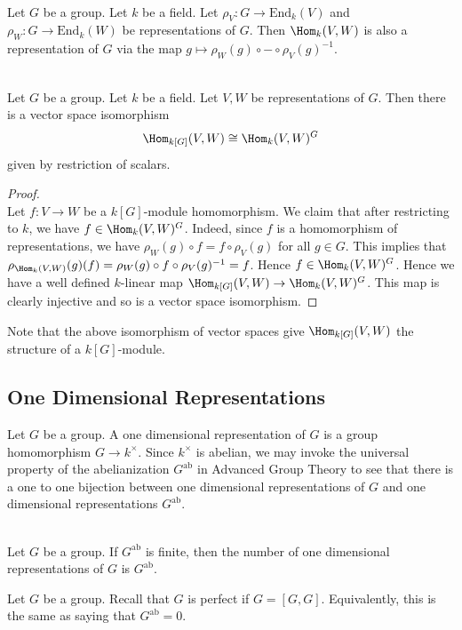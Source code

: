 \documentclass[a4paper]{article}
\begin{document}
\begin{lmm}{}{}\\
Let $G$ be a group. Let $k$ be a field. Let $\rho_V:G\to\text{End}_k(V)$ and $\rho_W:G\to\text{End}_k(W)$ be representations of $G$. Then $\Hom_k(V,W)$ is also a representation of $G$ via the map $g\mapsto\rho_W(g)\circ -\circ\rho_V(g)^{-1}$. 
\end{lmm}

\begin{prp}{}{}\\
Let $G$ be a group. Let $k$ be a field. Let $V,W$ be representations of $G$. Then there is a vector space isomorphism $$\Hom_{k[G]}(V,W)\cong\Hom_k(V,W)^G$$ given by restriction of scalars. 
\begin{proof}\\
Let $f:V\to W$ be a $k[G]$-module homomorphism. We claim that after restricting to $k$, we have $f\in\Hom_k(V,W)^G$. Indeed, since $f$ is a homomorphism of representations, we have $\rho_W(g)\circ f=f\circ\rho_V(g)$ for all $g\in G$. This implies that $\rho_{\Hom_k(V,W)}(g)(f)=\rho_W(g)\circ f\circ\rho_V(g)^{-1}=f$. Hence $f\in\Hom_k(V,W)^G$. Hence we have a well defined $k$-linear map $\Hom_{k[G]}(V,W)\to\Hom_k(V,W)^G$. This map is clearly injective and so is a vector space isomorphism. 
\end{proof}
\end{prp}

Note that the above isomorphism of vector spaces give $\Hom_{k[G]}(V,W)$ the structure of a $k[G]$-module. 

\subsection{One Dimensional Representations}
Let $G$ be a group. A one dimensional representation of $G$ is a group homomorphism $G\to k^\times$. Since $k^\times$ is abelian, we may invoke the universal property of the abelianization $G^\text{ab}$ in Advanced Group Theory to see that there is a one to one bijection between one dimensional representations of $G$ and one dimensional representations $G^\text{ab}$. 

\begin{lmm}{}{}\\
Let $G$ be a group. If $G^\text{ab}$ is finite, then the number of one dimensional representations of $G$ is $G^\text{ab}$. 
\end{lmm}


Let $G$ be a group. Recall that $G$ is perfect if $G=[G,G]$. Equivalently, this is the same as saying that $G^\text{ab}=0$. 
\end{document}
